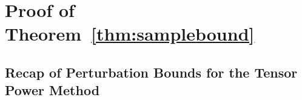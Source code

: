 %

\section{Proof of Theorem~\ref{thm:samplebound}}\label{app:samplebound}

\subsection{Recap of Perturbation Bounds for the Tensor Power Method}

